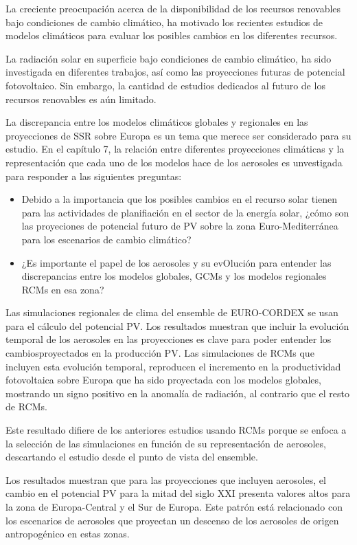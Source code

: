 La creciente preocupación acerca de la disponibilidad de los recursos renovables bajo condiciones de cambio climático, ha motivado los recientes estudios de modelos climáticos para evaluar los posibles cambios en los diferentes recursos.

La radiación solar en superficie bajo condiciones de cambio climático, ha sido investigada en diferentes trabajos, así como las proyecciones futuras de potencial fotovoltaico. Sin embargo, la cantidad de estudios dedicados al futuro de los recursos renovables es aún limitado.

La discrepancia entre los modelos climáticos globales y regionales en las proyecciones de SSR sobre Europa es un tema que merece ser considerado para su estudio. En el capítulo 7, la relación entre diferentes proyecciones climáticas y la representación que cada uno de los modelos hace de los aerosoles es unvestigada para responder a las siguientes preguntas:

\begin{itemize}
\item Debido a la importancia que los posibles cambios en el recurso solar tienen para las actividades de planifiación en el sector de la energía solar, ¿cómo son las proyeciones de potencial futuro de PV sobre la zona Euro-Mediterránea para los escenarios de cambio climático?
\item ¿Es importante el papel de los aerosoles y su evOlución para entender las discrepancias entre los modelos globales, GCMs y los modelos regionales RCMs en esa zona?
\end{itemize}

Las simulaciones regionales de clima del ensemble de EURO-CORDEX se usan para el cálculo del potencial PV. Los resultados muestran que incluir la evolución temporal de los aerosoles en las proyecciones es clave para poder entender los cambiosproyectados en la producción PV. Las simulaciones de RCMs que incluyen esta evolución temporal, reproducen el incremento en la productividad fotovoltaica sobre Europa que ha sido proyectada con los modelos globales, mostrando un signo positivo en la anomalía de radiación, al contrario que el resto de RCMs.

Este resultado difiere de los anteriores estudios usando RCMs porque se enfoca a la selección de las simulaciones en función de su representación de aerosoles, descartando el estudio desde el punto de vista del ensemble.

Los resultados muestran que para las proyecciones que incluyen aerosoles, el cambio en el potencial PV para la mitad del siglo XXI presenta valores altos para la zona de Europa-Central y el Sur de Europa. Este patrón está relacionado con los escenarios de aerosoles que proyectan un descenso de los aerosoles de origen antropogénico en estas zonas.

